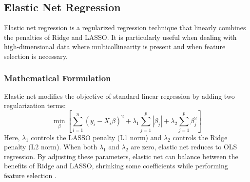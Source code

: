 \documentclass[english,11pt,a4paper,titlepage]{article}
\begin{document}
	\subsection*{Elastic Net Regression}
	Elastic net regression is a regularized regression technique that linearly combines the penalties of Ridge and LASSO. It is particularly useful when dealing with high-dimensional data where multicollinearity is present and when feature selection is necessary.
	
	\subsubsection*{Mathematical Formulation}
	Elastic net modifies the objective of standard linear regression by adding two regularization terms:
	\begin{equation*}
		\min_\beta \left[\sum_{i=1}^{n}(y_i - X_i\beta)^2 + \lambda_1 \sum_{j=1}^{p}|\beta_{j}| + \lambda_2 \sum_{j=1}^{p}\beta_{j}^{2}\right]
	\end{equation*}
	Here, $\lambda_1$ controls the LASSO penalty (L1 norm) and $\lambda_2$ controls the Ridge penalty (L2 norm). When both $\lambda_1$ and $\lambda_2$ are zero, elastic net reduces to OLS regression. By adjusting these parameters, elastic net can balance between the benefits of Ridge and LASSO, shrinking some coefficients while performing feature selection \cite{zouRegularizationVariableSelection2005}.
	
\end{document}
